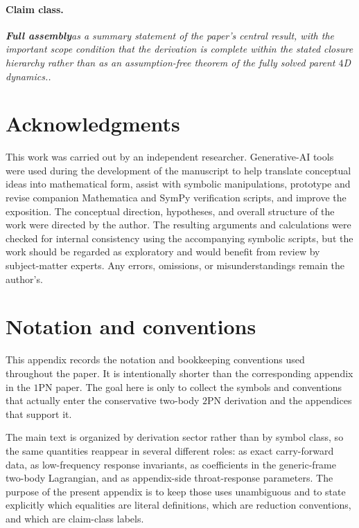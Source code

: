 \documentclass[11pt]{article}
\newcommand{\OnePN}{\mathrm{1PN}}
\newcommand{\TwoPN}{\mathrm{2PN}}
\newcommand{\FullMatch}{\textbf{Full assembly}}
\newcommand{\claimclass}[1]{\paragraph{Claim class.}\emph{#1.}}
\begin{document}
\claimclass{\FullMatch as a summary statement of the paper's central result, with the
important scope condition that the derivation is complete within the stated closure
hierarchy rather than as an assumption-free theorem of the fully solved parent \(4\)D
dynamics.}

\section*{Acknowledgments}
This work was carried out by an independent researcher.
Generative-AI tools were used during the development of the manuscript to help
translate conceptual ideas into mathematical form, assist with symbolic
manipulations, prototype and revise companion Mathematica and SymPy
verification scripts, and improve the exposition.
The conceptual direction, hypotheses, and overall structure of the work were
directed by the author.
The resulting arguments and calculations were checked for internal consistency
using the accompanying symbolic scripts, but the work should be regarded as
exploratory and would benefit from review by subject-matter experts.
Any errors, omissions, or misunderstandings remain the author's.

\appendix

\section{Notation and conventions}
\label{app:notation}

This appendix records the notation and bookkeeping conventions used throughout the
paper.  It is intentionally shorter than the corresponding appendix in the
\(\OnePN\) paper.  The goal here is only to collect the symbols and conventions that
actually enter the conservative two-body \(\TwoPN\) derivation and the appendices that
support it.

The main text is organized by derivation sector rather than by symbol class, so the same
quantities reappear in several different roles: as exact carry-forward data, as
low-frequency response invariants, as coefficients in the generic-frame two-body
Lagrangian, and as appendix-side throat-response parameters.  The purpose of the present
appendix is to keep those uses unambiguous and to state explicitly which equalities are
literal definitions, which are reduction conventions, and which are claim-class labels.
\end{document}
